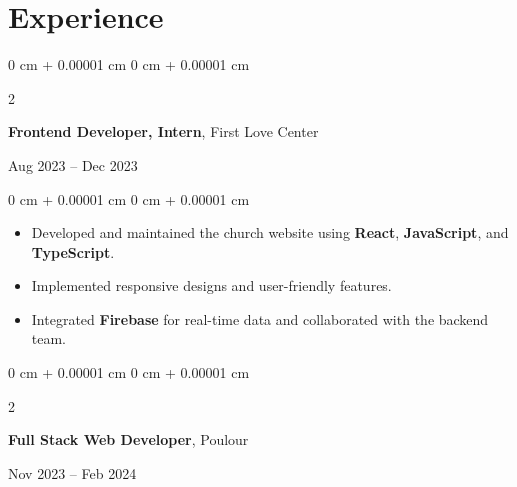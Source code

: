 \documentclass[10pt, letterpaper]{article}
\newenvironment{highlights}{
    \begin{itemize}[
        topsep=0.10 cm,
        parsep=0.10 cm,
        partopsep=0pt,
        itemsep=0pt,
        leftmargin=0 cm + 10pt
    ]
}{
    \end{itemize}
} %
\newenvironment{onecolentry}{
    \begin{adjustwidth}{
        0 cm + 0.00001 cm
    }{
        0 cm + 0.00001 cm
    }
}{
    \end{adjustwidth}
} %
\newenvironment{twocolentry}[2][]{
    \onecolentry
    \def\secondColumn{#2}
    \setcolumnwidth{\fill, 4.5 cm}
    \begin{paracol}{2}
}{
    \switchcolumn \raggedleft \secondColumn
    \end{paracol}
    \endonecolentry
} %
\begin{document}





\section{Experience}

\vspace{0.30 cm}

\begin{twocolentry}{Aug 2023 – Dec 2023}
    \textbf{Frontend Developer, Intern}, First Love Center
\end{twocolentry}

\vspace{0.10 cm}
\begin{onecolentry}
    \begin{highlights}
        \item Developed and maintained the church website using \textbf{React},
        \textbf{JavaScript}, and \textbf{TypeScript}.
        \item Implemented responsive designs and user-friendly features.
        \item Integrated \textbf{Firebase} for real-time data and collaborated with the
        backend team.
    \end{highlights}
\end{onecolentry}

\vspace{0.30 cm}

\begin{twocolentry}{Nov 2023 – Feb 2024}
    \textbf{Full Stack Web Developer}, Poulour
\end{twocolentry}
\end{document}
